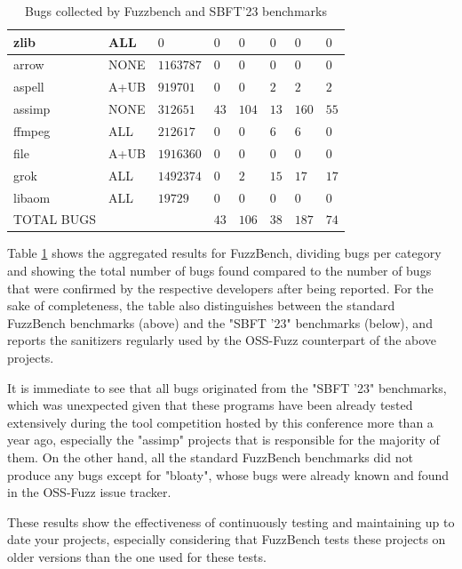 \begin{table}[h]
{\begin{tabular}{|l|l|l|l|l|l|l|l|}
zlib   &ALL   &$0$   &$0$   &$0$   &$0$   &$0$   &$0$ \\
\hline
arrow   &NONE   &$1163787$   &$0$   &$0$   &$0$   &$0$   &$0$ \\
aspell   &A+UB   &$919701$   &$0$   &$0$   &$2$   &$2$   &$2$ \\
assimp   &NONE   &$312651$   &$43$   &$104$   &$13$   &$160$   &$55$ \\
ffmpeg   &ALL   &$212617$   &$0$   &$0$   &$6$   &$6$   &$0$ \\
file   &A+UB   &$1916360$   &$0$   &$0$   &$0$   &$0$   &$0$ \\
grok   &ALL   &$1492374$   &$0$   &$2$   &$15$   &$17$   &$17$ \\
libaom   &ALL   &$19729$   &$0$   &$0$   &$0$   &$0$   &$0$ \\
\hline
TOTAL BUGS   &   &   &$43$   &$106$   &$38$   &$187$   &$74$          \\
\hline
\end{tabular}}
\vspace{10pt}
\caption{Bugs collected by Fuzzbench and SBFT'23 benchmarks}
\label{fuzzbench-table}
\end{table}
Table \ref{fuzzbench-table} shows the aggregated results for FuzzBench, dividing bugs per category and showing the total number of bugs found compared to the number of bugs that were confirmed by the respective developers after being reported. For the sake of completeness, the table also distinguishes between the standard FuzzBench benchmarks (above) and the "SBFT '23" benchmarks (below), and reports the sanitizers regularly used by the OSS-Fuzz counterpart of the above projects.

It is immediate to see that all bugs originated from the "SBFT '23" benchmarks, which was unexpected given that these programs have been already tested extensively during the tool competition hosted by this conference more than a year ago, especially the "assimp" projects that is responsible for the majority of them. On the other hand, all the standard FuzzBench benchmarks did not produce any bugs except for "bloaty", whose bugs were already known and found in the OSS-Fuzz issue tracker.

These results show the effectiveness of continuously testing and maintaining up to date your projects, especially considering that FuzzBench tests these projects on older versions than the one used for these tests. 







